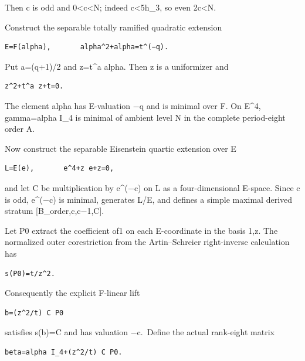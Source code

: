 Then c is odd and 0\textless c\textless N; indeed c\textless5h\_3, so
even 2c\textless N.

Construct the separable totally ramified quadratic extension

\begin{Verbatim}[fontsize=\small,breaklines=true,breakanywhere=true]
E=F(alpha),       alpha^2+alpha=t^(−q).
\end{Verbatim}

Put a=(q+1)/2 and z=t\^{}a alpha. Then z is a uniformizer and

\begin{Verbatim}[fontsize=\small,breaklines=true,breakanywhere=true]
z^2+t^a z+t=0.
\end{Verbatim}

The element alpha has E-valuation −q and is minimal over F. On E\^{}4,
gamma=alpha I\_4 is minimal of ambient level N in the complete
period-eight order A.

Now construct the separable Eisenstein quartic extension over E

\begin{Verbatim}[fontsize=\small,breaklines=true,breakanywhere=true]
L=E(e),       e^4+z e+z=0,
\end{Verbatim}

and let C be multiplication by e\^{}(−c) on L as a four-dimensional
E-space. Since c is odd, e\^{}(−c) is minimal, generates L/E, and
defines a simple maximal derived stratum {[}B\_order,c,c−1,C{]}.

Let P0 extract the coefficient of1 on each E-coordinate in the basis
1,z. The normalized outer corestriction from the Artin--Schreier
right-inverse calculation has

\begin{Verbatim}[fontsize=\small,breaklines=true,breakanywhere=true]
s(P0)=t/z^2.
\end{Verbatim}

Consequently the explicit F-linear lift

\begin{Verbatim}[fontsize=\small,breaklines=true,breakanywhere=true]
b=(z^2/t) C P0
\end{Verbatim}

satisfies s(b)=C and has valuation −c.~Define the actual rank-eight
matrix

\begin{Verbatim}[fontsize=\small,breaklines=true,breakanywhere=true]
beta=alpha I_4+(z^2/t) C P0.
\end{Verbatim}

